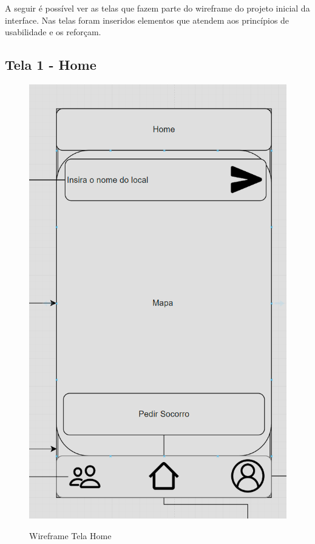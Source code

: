 A seguir é possível ver as telas que fazem parte do wireframe do projeto inicial da interface. Nas telas foram inseridos elementos que atendem aos princípios de usabilidade e os reforçam.
\subsection{Tela 1 - Home}
\begin{figure}[H]
  \begin{center}
  \includegraphics[width=0.3\linewidth]{images/wire-tela-home.png}\\
  \end{center}
  \caption[Wireframe Tela Home]{Wireframe Tela Home}
  \label{fig:wireframe-tela-home}
\end{figure}
